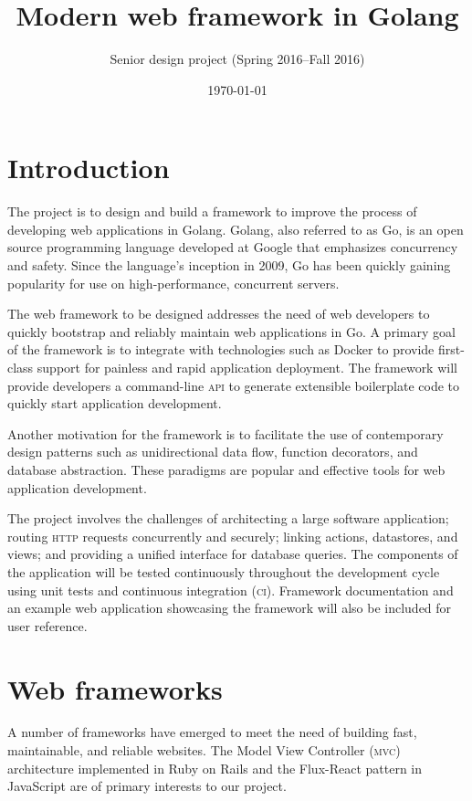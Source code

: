 \documentclass{article}
\title{Modern web framework in Golang}
\author{Senior design project (Spring 2016--Fall 2016)}
\date{\today}
\begin{document}
\maketitle

\section{Introduction}

The project is to design and build a framework to improve the process of developing web applications in Golang. Golang, also referred to as Go, is an open source programming language developed at Google that emphasizes concurrency and safety. Since the language’s inception in 2009, Go has been quickly gaining popularity for use on high-performance, concurrent servers.

The web framework to be designed addresses the need of web developers to quickly bootstrap and reliably maintain web applications in Go. A primary goal of the framework is to integrate with technologies such as Docker to provide first-class support for painless and rapid application deployment. The framework will provide developers a command-line \textsc{api} to generate extensible boilerplate code to quickly start application development.

Another motivation for the framework is to facilitate the use of contemporary design patterns such as unidirectional data flow, function decorators, and database abstraction. These paradigms are popular and effective tools for web application development.

The project involves the challenges of architecting a large software application; routing \textsc{http} requests concurrently and securely; linking actions, datastores, and views; and providing a unified interface for database queries. The components of the application will be tested continuously throughout the development cycle using unit tests and continuous integration (\textsc{ci}). Framework documentation and an example web application showcasing the framework will also be included for user reference. 

\section{Web frameworks}

A number of frameworks have emerged to meet the need of building fast, maintainable, and reliable websites. The Model View Controller (\textsc{mvc}) architecture implemented in Ruby on Rails and the Flux-React pattern in JavaScript are of primary interests to our project.
 
\end{document}
